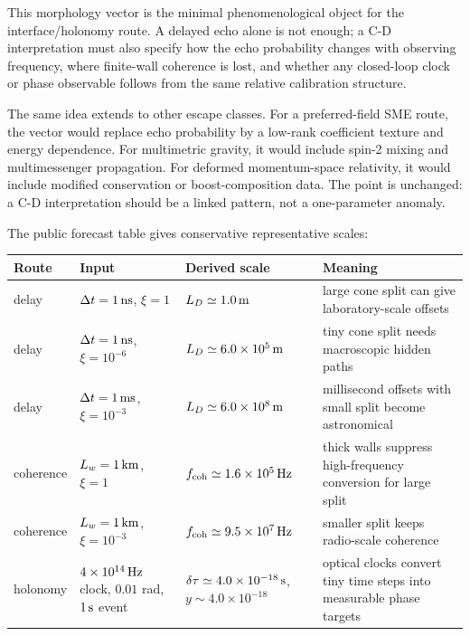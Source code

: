 \documentclass[11pt]{article}
\begin{document}
This morphology vector is the minimal phenomenological object for the interface/holonomy route. A delayed echo alone is not enough; a C-D interpretation must also specify how the echo probability changes with observing frequency, where finite-wall coherence is lost, and whether any closed-loop clock or phase observable follows from the same relative calibration structure.


The same idea extends to other escape classes. For a preferred-field SME route, the vector would replace echo probability by a low-rank coefficient texture and energy dependence. For multimetric gravity, it would include spin-2 mixing and multimessenger propagation. For deformed momentum-space relativity, it would include modified conservation or boost-composition data. The point is unchanged: a C-D interpretation should be a linked pattern, not a one-parameter anomaly.


The public forecast table gives conservative representative scales:


\begin{center}
\small
\begin{tabularx}{\textwidth}{@{}>{\raggedright\arraybackslash}p{} >{\raggedright\arraybackslash}p{} >{\raggedright\arraybackslash}p{} >{\raggedright\arraybackslash}p{}@{}}
\toprule
Route & Input & Derived scale & Meaning \\
\midrule
delay & \(\Delta t=1\,{\rm ns}\), \(\xi=1\) & \(L_D\simeq1.0\,{\rm m}\) & large cone split can give laboratory-scale offsets \\
delay & \(\Delta t=1\,{\rm ns}\), \(\xi=10^{-6}\) & \(L_D\simeq6.0\times10^5\,{\rm m}\) & tiny cone split needs macroscopic hidden paths \\
delay & \(\Delta t=1\,{\rm ms}\), \(\xi=10^{-3}\) & \(L_D\simeq6.0\times10^8\,{\rm m}\) & millisecond offsets with small split become astronomical \\
coherence & \(L_w=1\,{\rm km}\), \(\xi=1\) & \(f_{\rm coh}\simeq1.6\times10^5\,{\rm Hz}\) & thick walls suppress high-frequency conversion for large split \\
coherence & \(L_w=1\,{\rm km}\), \(\xi=10^{-3}\) & \(f_{\rm coh}\simeq9.5\times10^7\,{\rm Hz}\) & smaller split keeps radio-scale coherence \\
holonomy & \(4\times10^{14}\,{\rm Hz}\) clock, \(0.01\) rad, \(1\,{\rm s}\) event & \(\delta\tau\simeq4.0\times10^{-18}\,{\rm s}\), \(y\sim4.0\times10^{-18}\) & optical clocks convert tiny time steps into measurable phase targets \\
\bottomrule
\end{tabularx}
\end{center}
\end{document}

